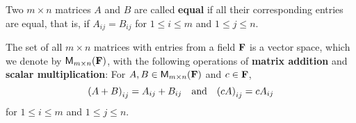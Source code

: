 \begin{defn}\label{1.2.8}
    Two \(m \times n\) matrices \(A\) and \(B\) are called \textbf{equal} if all their corresponding entries are equal, that is, if \(A_{i j} = B_{i j}\) for \(1 \leq i \leq m\) and \(1 \leq j \leq n\).
\end{defn}

\begin{eg}\label{1.2.9}
    The set of all \(m \times n\) matrices with entries from a field \(\mathbf{F}\) is a vector space, which we denote by \({{\mathsf{M}_{{m} \times n}({\mathbf{F}})}}\), with the following operations of \textbf{matrix addition} and \textbf{scalar multiplication}:
    For \(A, B \in {{\mathsf{M}_{{m} \times n}({\mathbf{F}})}}\) and \(c \in \mathbf{F}\),
    \[
        \p{A + B}_{i j} = A_{i j} + B_{i j} \quad \text{and} \quad \p{c A}_{i j} = c A_{i j}
    \]
    for \(1 \leq i \leq m\) and \(1 \leq j \leq n\).
\end{eg}

